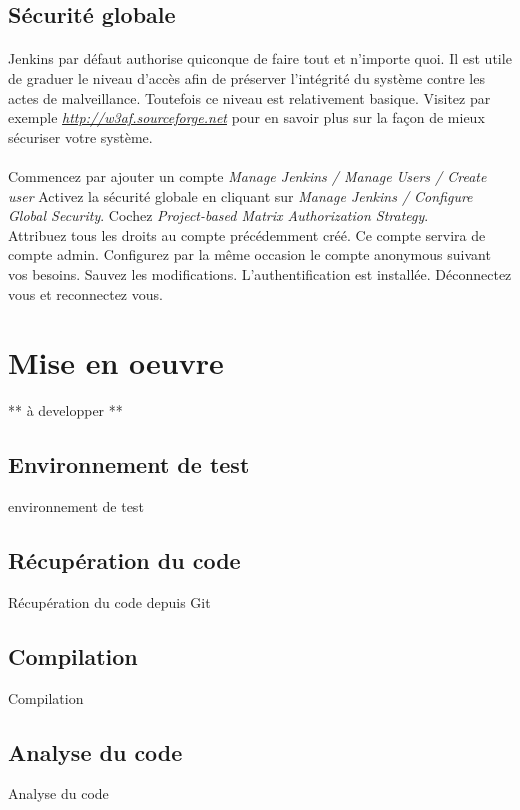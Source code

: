 \documentclass{article}
\begin{document}
 \subsection{Sécurité globale}
 \paragraph{} Jenkins par défaut authorise quiconque de faire tout et n'importe quoi. Il est utile de graduer le niveau d'accès afin de préserver l'intégrité du système contre les actes de malveillance. Toutefois ce niveau est relativement basique. Visitez par exemple \textit{\url{http://w3af.sourceforge.net}} pour en savoir plus sur la façon de mieux sécuriser votre système.\\
\\
Commencez par ajouter un compte  \textit{Manage Jenkins / Manage Users / Create user }
Activez la sécurité globale en cliquant sur \textit{Manage Jenkins / Configure Global Security}. Cochez \textit{ Project-based Matrix Authorization Strategy}. \\
Attribuez  tous les droits au compte précédemment créé. Ce compte servira de compte admin.
Configurez par la même occasion le compte anonymous suivant vos besoins.
Sauvez les modifications. L'authentification est installée. Déconnectez vous et reconnectez vous. \\

\newpage
\section{Mise en oeuvre}\label{mise en oeuvre}
** à developper **

\subsection{Environnement de test}
environnement de test

\subsection{Récupération du code}
Récupération du code depuis Git

\subsection{Compilation}
Compilation

\subsection{Analyse du code}
Analyse du code
\end{document}
